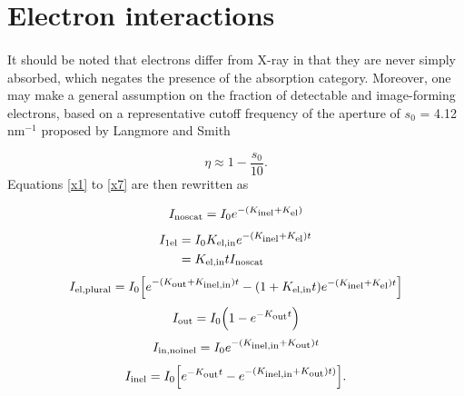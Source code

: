 \documentclass[]{article}
\newcommand\nt{\textup{\scriptsize{0}}}
\newcommand\el{\textup{\scriptsize{el}}}
\newcommand\inel{\textup{\scriptsize{inel}}}
\newcommand\elin{\textup{\scriptsize{el,in}}}
\newcommand\inelin{\textup{\scriptsize{inel,in}}}
\newcommand\out{\textup{\scriptsize{out}}}
\newcommand\noscat{\textup{\scriptsize{noscat}}}
\newcommand\sel{\textup{\scriptsize{1el}}}
\newcommand\elpl{\textup{\scriptsize{el,plural}}}
\newcommand\innoinel{\textup{\scriptsize{in,noinel}}}
\begin{document}
\section{Electron interactions}

\paragraph{} It should be noted that electrons differ from X-ray in that they are never simply absorbed, which negates the presence of the absorption category. Moreover, one may make a general assumption on the fraction of detectable and image-forming electrons, based on a representative cutoff frequency of the aperture of $s_0$ = 4.12 $\mathrm{nm}^{-1}$ proposed by Langmore and Smith \cite{Langmore:1992kk}

\begin{equation}
\eta \approx 1 - \frac{s_0}{10}.
\end{equation}
Equations \ref{x1} to \ref{x7} are then rewritten as

\begin{equation}
I_{\noscat} = I_{\nt}e^{-(K_{\inel}+K_{\el})}
\label{e1}
\end{equation} %
\begin{equation}
\begin{aligned}
I_{\sel} &= I_{\nt}K_{\elin}e^{-(K_{\inel}+K_{\el})t} \\ &= K_{\elin}tI_{\noscat}
\end{aligned}
\label{e2}
\end{equation} %
\begin{equation}
I_{\elpl} = I_{\nt} \Big[ e^{-(K_{\out}+K_{\inelin})t} - (1+K_{\elin}t)e^{-(K_{\inel}+K_{\el})t} \Big]
\label{e3}
\end{equation} %
\begin{equation}
I_{\out} = I_{\nt} \Big(1 - e^{-K_{\out}t}\Big)
\label{e4}
\end{equation} %
\begin{equation}
I_{\innoinel} = I_{\nt}e^{-(K_{\inelin}+K_{\out})t}
\label{e6}
\end{equation} %
\begin{equation}
I_{\inel} = I_{\nt}\Big[e^{-K_{\out}t} - e^{-(K_{\inelin}+K_{\out})t)}\Big].
\label{e7}
\end{equation} %
\end{document}
